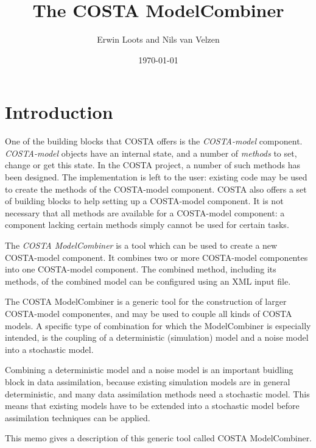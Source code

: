 \documentclass[a4paper,12pt]{article}
\title{The COSTA ModelCombiner}
\author{Erwin Loots and Nils van Velzen}
\date{\today}
\begin{document}
\memotitlepage

\begin{vtlogsheet}
\end{vtlogsheet}

\tableofcontents


\section{Introduction}

One of the building blocks that COSTA offers is the 
{\em COSTA-model}
component.  {\em COSTA-model} objects have an internal state, and a number of
{\em methods} to set, change or get this state.  In the COSTA project, a
number of such methods has been designed.  The implementation is left to
the user: existing code may be used to create the methods of the
COSTA-model component.  COSTA also offers a set of building blocks to help
setting up a COSTA-model component.  It is not necessary that all methods are
available for a COSTA-model component: a component lacking certain methods
simply cannot be used for certain tasks. 

The {\em COSTA ModelCombiner} is a tool which can be used to create a new
COSTA-model component. It combines two or more COSTA-model componentes into
one COSTA-model component. The combined method, including its methods, of
the combined model can be configured using an XML input file. 

The COSTA ModelCombiner is a generic tool for the construction of larger
COSTA-model componentes, and may be used to couple all kinds of COSTA models.
A specific type of combination for which the ModelCombiner is especially
intended, is the coupling of a deterministic (simulation) model and a noise
model into a stochastic model. 

Combining a deterministic model and a noise model is an important buidling
block in data assimilation, because existing simulation models are in
general deterministic, and many data assimilation methods need a stochastic
model.  This means that existing models have to be extended into a
stochastic model before assimilation techniques can be applied.

This memo gives a description of this generic tool called COSTA 
ModelCombiner.
\end{document}
